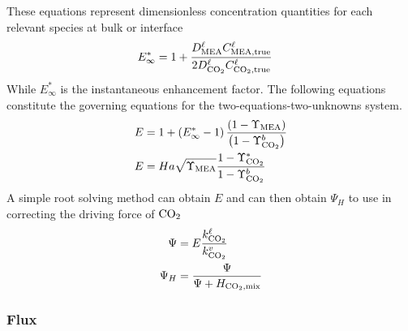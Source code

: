 \documentclass[a4paper,fleqn]{cas-sc}
\newcommand{\COtwo}{{\ce{CO2}}}
\newcommand{\MEA}{{\ce{MEA}}}
\newcommand{\liq}{\ell}
\newcommand{\vap}{v}
\begin{document}
    These equations represent dimensionless concentration quantities for each relevant species at bulk or interface
    \begin{align}
        E_{\infty}^{*} &= 1+\frac{D^{\liq}_{\MEA} C^{\liq}_{\MEA, \text{true}}}{2 D^{\liq}_{ \COtwo} C^{\liq}_{ \COtwo, \text{true}}}
    \end{align}
    While $E_{\infty}^*$ is the instantaneous enhancement factor. The following equations constitute the governing equations for the two-equations-two-unknowns system.
    \begin{align}
        E &= 1+\left(E_{\infty}^*-1\right) \frac{\left(1-\Upsilon_{\MEA}\right)}{\left(1-\Upsilon_{\COtwo}^b\right)} \\
        E &= Ha \sqrt{\Upsilon_{\MEA}} \frac{1-\Upsilon_{\COtwo}^*}{1-\Upsilon_{\COtwo}^b}
    \end{align}
    A simple root solving method can obtain $E$ and can then obtain $\Psi_H$ to use in correcting the driving force of $\COtwo$
    \begin{align}
        \Psi &= E \frac{k^{\liq}_{ \COtwo}}{k^{\vap}_{ \COtwo}} \\
        \Psi_H &= \frac{\Psi}{\Psi + H_{\COtwo, \text{mix}}}
    \end{align}

    \subsubsection{Flux}
\end{document}
